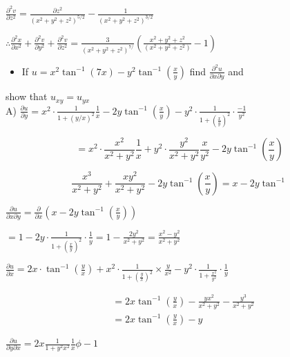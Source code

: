 \documentclass[12pt, a4paper]{article}
\begin{document}
$\frac{\partial^{2} v}{\partial z^{2}}=\frac{\partial z^{2}}{\left(x^{2}+y^{2}+z^{2}\right)^{5 / 2}}-\frac{1}{\left(x^{2}+y^{2}+z^{2}\right)^{3 / 2}}$

$\therefore \frac{\partial^{2} x}{\partial x^{2}}+\frac{\partial^{2} v}{\partial y^{2}}+\frac{\partial^{2} v}{\partial z^{2}}=\frac{3}{\left(x^{2}+y^{2}+z^{2}\right)^{7 /}}\left(\frac{x^{2}+y^{2}+z^{2}}{\left(x^{2}+y^{2}+z^{2}\right)}-1\right)$

\begin{itemize}
  \item If $u=x^{2} \tan ^{-1}(7 x)-y^{2} \tan ^{-1}\left(\frac{x}{y}\right)$ find $\frac{\partial^{2} u}{\partial x \partial y}$ and
\end{itemize}

show that $u_{x y}=u_{y x}$\\
A) $\frac{\partial u}{\partial y}=x^{2} \cdot \frac{1}{1+(y / x)^{2}} \frac{1}{x}-2 y \tan ^{-1}\left(\frac{x}{y}\right)-y^{2} \cdot \frac{1}{1+\left(\frac{x}{y}\right)^{2}} \cdot \frac{-1}{y^{2}}$

$$
=x^{2} \cdot \frac{x^{2}}{x^{2}+y^{2}} \frac{1}{x}+y^{2} \cdot \frac{y^{2}}{x^{2}+y^{2}} \frac{x}{y^{2}}-2 y \tan ^{-1}\left(\frac{x}{y}\right)
$$


\begin{equation*}
\frac{x^{3}}{x^{2}+y^{2}}+\frac{x y^{2}}{x^{2}+y^{2}}-2 y \tan ^{-1}\left(\frac{x}{y}\right)=x-2 y \tan ^{-1} \tag{x}
\end{equation*}


$\frac{\partial u}{\partial x \partial y}=\frac{\partial}{\partial x}\left(x-2 y \tan ^{-1}\left(\frac{x}{y}\right)\right)$

$=1-2 y \cdot \frac{1}{1+\left(\frac{x}{y}\right)^{2}} \cdot \frac{1}{y}=1-\frac{2 y^{2}}{x^{2}+y^{2}}=\frac{x^{2}-y^{2}}{x^{2}+y^{2}}$

$\frac{\partial u}{\partial x}=2 x \cdot \tan ^{-1}\left(\frac{y}{x}\right)+x^{2} \cdot \frac{1}{1+\left(\frac{y}{x}\right)^{2}} \times \frac{y}{x^{2}}-y^{2} \cdot \frac{1}{1+\frac{x^{2}}{y^{2}}} \cdot \frac{1}{y}$

$$
\begin{aligned}
& =2 x \tan ^{-1}\left(\frac{y}{x}\right)-\frac{y x^{2}}{x^{2}+y^{2}}-\frac{y^{3}}{x^{2}+y^{2}} \\
& =2 x \tan ^{-1}\left(\frac{y}{x}\right)-y
\end{aligned}
$$

$\frac{\partial u}{\partial y \partial x}=2 x \frac{1}{1+y^{2} x^{2}} \frac{1}{x} \phi-1$
\end{document}
